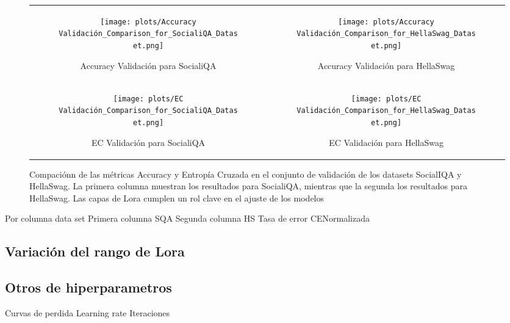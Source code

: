 \begin{figure}[H]
    \centering
    \begin{tabular}{cc}
        \begin{subfigure}{0.45\textwidth}
            \centering
            \texttt{[image: plots/Accuracy Validación\_Comparison\_for\_SocialiQA\_Dataset.png]}
            \caption{Accuracy Validación para SocialiQA}
            \label{fig:socialiqa_accuracy}
        \end{subfigure} &
        \begin{subfigure}{0.45\textwidth}
            \centering
            \texttt{[image: 
            plots/Accuracy Validación\_Comparison\_for\_HellaSwag\_Dataset.png]}
            \caption{Accuracy Validación para HellaSwag}
            \label{fig:hellaswag_accuracy}
        \end{subfigure} \\

        \begin{subfigure}{0.45\textwidth}
            \centering
            \texttt{[image: plots/EC Validación\_Comparison\_for\_SocialiQA\_Dataset.png]}
            \caption{EC Validación para SocialiQA}
            \label{fig:socialiqa_ec}
        \end{subfigure} &
        \begin{subfigure}{0.45\textwidth}
            \centering
            \texttt{[image: plots/EC Validación\_Comparison\_for\_HellaSwag\_Dataset.png]}
            \caption{EC Validación para HellaSwag}
            \label{fig:hellaswag_ec}
        \end{subfigure}
    \end{tabular}
    \caption{Compaciónn de las métricas Accuracy y Entropía Cruzada en el conjunto de validación de los datasets SocialIQA y HellaSwag. La primera columna muestran los resultados para SocialiQA, mientras que la segunda los resultados para HellaSwag. Las capas de Lora cumplen un rol clave en el ajuste de los modelos}
    \label{fig:comparison}
\end{figure}


Por columna data set 
Primera columna SQA Segunda columna HS
Tasa de error
CENormalizada

\subsection{Variación del rango de Lora}


\subsection{Otros de hiperparametros}
Curvas de perdida
Learning rate
Iteraciones
